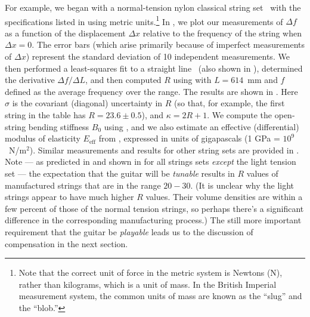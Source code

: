 For example, we began with a normal-tension nylon classical string set~\cite{ref:daddariostcweb} with the specifications listed in  using metric units.\footnote{Note that the correct unit of force in the metric system is Newtons (N), rather than kilograms, which is a unit of mass. In the British Imperial measurement system, the common units of mass are known as the ``slug'' and the ``blob.''} In , we plot our measurements of $\Delta f$ as a function of the displacement $\Delta x$ relative to the frequency of the string when $\Delta x = 0$. The error bars (which arise primarily because of imperfect measurements of $\Delta x$) represent the standard deviation of 10 independent measurements. We then performed a least-squares fit to a straight line~\cite{ref:bevington2003dre} (also shown in ), determined the derivative $\Delta f / \Delta L$, and then computed $R$ using  with $L = 614$~mm and $f$ defined as the average frequency over the range. The results are shown in . Here $\sigma$ is the covariant (diagonal) uncertainty in $R$ (so that, for example, the first string in the table has $R = 23.6 \pm 0.5$), and $\kappa = 2 R + 1$. We compute the open-string bending stiffness $B_0$ using , and we also estimate an effective (differential) modulus of elasticity $E_\mathrm{eff}$ from , expressed in units of gigapascals (1 GPa = $10^9$~N/m$^2$). Similar measurements and results for other string sets are provided in . Note --- as predicted in  and shown in  for all strings sets \emph{except} the light tension set --- the expectation that the guitar will be \emph{tunable} results in $R$ values of manufactured strings that are in the range $20 - 30$. (It is unclear why the light strings appear to have much higher $R$ values. Their volume densities are within a few percent of those of the normal tension strings, so perhaps there's a significant difference in the corresponding manufacturing process.) The still more important requirement that the guitar be \emph{playable} leads us to the discussion of compensation in the next section.

